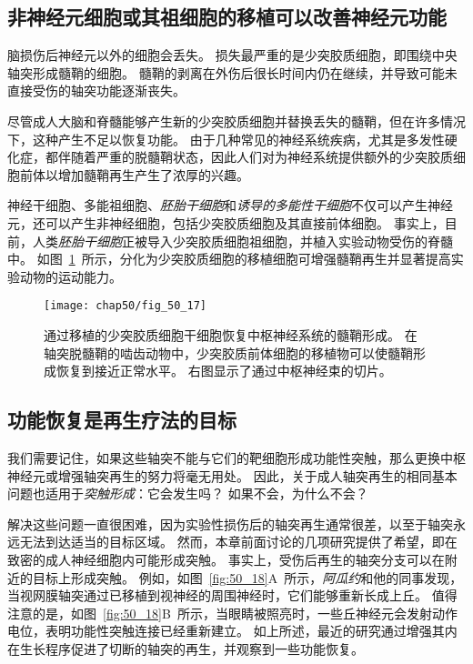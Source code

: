 \subsection{非神经元细胞或其祖细胞的移植可以改善神经元功能}

脑损伤后神经元以外的细胞会丢失。
损失最严重的是少突胶质细胞，即围绕中央轴突形成髓鞘的细胞。
髓鞘的剥离在外伤后很长时间内仍在继续，并导致可能未直接受伤的轴突功能逐渐丧失。


尽管成人大脑和脊髓能够产生新的少突胶质细胞并替换丢失的髓鞘，但在许多情况下，这种产生不足以恢复功能。
由于几种常见的神经系统疾病，尤其是多发性硬化症，都伴随着严重的脱髓鞘状态，因此人们对为神经系统提供额外的少突胶质细胞前体以增加髓鞘再生产生了浓厚的兴趣。


神经干细胞、多能祖细胞、\textit{胚胎干细胞}和\textit{诱导的多能性干细胞}不仅可以产生神经元，还可以产生非神经细胞，包括少突胶质细胞及其直接前体细胞。
事实上，目前，人类\textit{胚胎干细胞}正被导入少突胶质细胞祖细胞，并植入实验动物受伤的脊髓中。
如图~\ref{fig:50_17}~所示，分化为少突胶质细胞的移植细胞可增强髓鞘再生并显著提高实验动物的运动能力。


\begin{figure}[htbp]
	\centering
	\texttt{[image: chap50/fig\_50\_17]}
	\caption{通过移植的少突胶质细胞干细胞恢复中枢神经系统的髓鞘形成。
		在轴突脱髓鞘的啮齿动物中，少突胶质前体细胞的移植物可以使髓鞘形成恢复到接近正常水平。
		右图显示了通过中枢神经束的切片\cite{franklin2008remyelination}。}
	\label{fig:50_17}
\end{figure}


\subsection{功能恢复是再生疗法的目标}

我们需要记住，如果这些轴突不能与它们的靶细胞形成功能性突触，那么更换中枢神经元或增强轴突再生的努力将毫无用处。
因此，关于成人轴突再生的相同基本问题也适用于\textit{突触形成}：它会发生吗？
如果不会，为什么不会？


解决这些问题一直很困难，因为实验性损伤后的轴突再生通常很差，以至于轴突永远无法到达适当的目标区域。
然而，本章前面讨论的几项研究提供了希望，即在致密的成人神经细胞内可能形成突触。
事实上，受伤后再生的轴突分支可以在附近的目标上形成突触。
例如，如图~\ref{fig:50_18}A~所示，\textit{阿瓜约}和他的同事发现，当视网膜轴突通过已移植到视神经的周围神经时，它们能够重新长成上丘。
值得注意的是，如图~\ref{fig:50_18}B~所示，当眼睛被照亮时，一些丘神经元会发射动作电位，表明功能性突触连接已经重新建立。
如上所述，最近的研究通过增强其内在生长程序促进了切断的轴突的再生，并观察到一些功能恢复。


